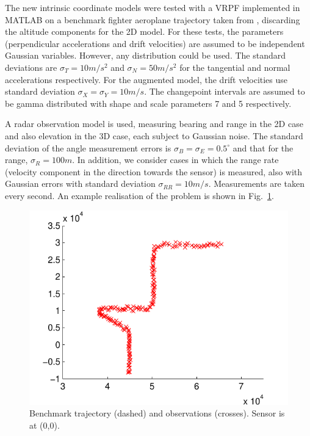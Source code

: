 \documentclass[conference]{IEEEtran}
\begin{document}
The new intrinsic coordinate models were tested with a VRPF implemented in MATLAB on a benchmark fighter aeroplane trajectory taken from \cite{Blair1998}, discarding the altitude components for the 2D model. For these tests, the parameters (perpendicular accelerations and drift velocities) are assumed to be independent Gaussian variables. However, any distribution could be used. The standard deviations are $\sigma_T = 10 m/s^2$ and $\sigma_N = 50 m/s^2$ for the tangential and normal accelerations respectively. For the augmented model, the drift velocities use standard deviation $\sigma_X = \sigma_Y = 10 m/s$. The changepoint intervals are assumed to be gamma distributed with shape and scale parameters 7 and 5 respectively.

A radar observation model is used, measuring bearing and range in the 2D case and also elevation in the 3D case, each subject to Gaussian noise. The standard deviation of the angle measurement errors is $\sigma_B = \sigma_E = 0.5^{\circ}$ and that for the range, $\sigma_R = 100m$. In addition, we consider cases in which the range rate (velocity component in the direction towards the sensor) is measured, also with Gaussian errors with standard deviation $\sigma_{RR} = 10m/s$. Measurements are taken every second. An example realisation of the problem is shown in Fig.~\ref{fig:2D_ground_truth}.

\begin{figure}
\centering
\includegraphics[width=0.95\columnwidth]{images/benchmark_problem.pdf}
\caption{Benchmark trajectory (dashed) and observations (crosses). Sensor is at (0,0).}
\label{fig:2D_ground_truth}
\end{figure}
\end{document}

